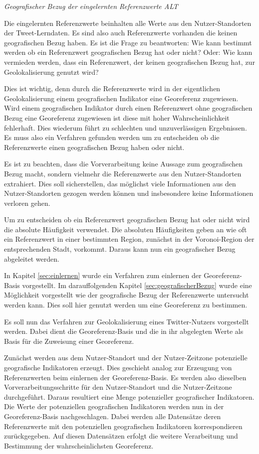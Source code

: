 		\textit{Geografischer Bezug der eingelernten Referenzwerte ALT} \label{sec:geografischerBezug} 
			
			Die eingelernten Referenzwerte beinhalten alle Werte aus den Nutzer-Standorten der Tweet-Lerndaten.
			Es sind also auch Referenzwerte vorhanden die keinen geografischen Bezug haben.
			Es ist die Frage zu beantworten: Wie kann bestimmt werden ob ein Referenzwert geografischen Bezug hat oder nicht?
			Oder: Wie kann vermieden werden, dass ein Referenzwert, der keinen geografischen Bezug hat, zur Geolokalisierung genutzt wird?
			
			Dies ist wichtig, denn durch die Referenzwerte wird in der eigentlichen Geolokalisierung einem geografischen Indikator eine Georeferenz zugewiesen. 
			Wird einem geografischen Indikator durch einen Referenzwert ohne geografischen Bezug eine Georeferenz zugewiesen ist diese mit hoher Wahrscheinlichkeit fehlerhaft.
			Dies wiederum führt zu schlechten und unzuverlässigen Ergebnissen.
			Es muss also ein Verfahren gefunden werden um zu entscheiden ob die Referenzwerte einen geografischen Bezug haben oder nicht.

			Es ist zu beachten, dass die Vorverarbeitung keine Aussage zum geografischen Bezug macht, sondern vielmehr die Referenzwerte aus den Nutzer-Standorten extrahiert. 
			Dies soll sicherstellen, das möglichst viele Informationen aus den Nutzer-Standorten gezogen werden können und insbesondere keine Informationen verloren gehen.  
			
			Um zu entscheiden ob ein Referenzwert geografischen Bezug hat oder nicht wird die absolute Häufigkeit verwendet.
			Die absoluten Häufigkeiten geben an wie oft ein Referenzwert in einer bestimmten Region, zunächst in der Voronoi-Region der entsprechenden Stadt, vorkommt.			 
			Daraus kann nun ein geografischer Bezug abgeleitet werden.

			In Kapitel \ref{sec:einlernen} wurde ein Verfahren zum einlernen der Georeferenz-Basis vorgestellt. 
			Im darauffolgenden Kapitel \ref{sec:geografischerBezug} wurde eine Möglichkeit vorgestellt wie der geografische Bezug der Referenzwerte untersucht werden kann.
			Dies soll hier genutzt werden um eine Georeferenz zu bestimmen. 

			Es soll nun das Verfahren zur Geolokalisierung eines Twitter-Nutzers vorgestellt werden.
			Dabei dient die Georeferenz-Basis und die in ihr abgelegten Werte als Basis für die Zuweisung einer Georeferenz.

			Zunächst werden aus dem Nutzer-Standort und der Nutzer-Zeitzone potenzielle geografische Indikatoren erzeugt.
			Dies geschieht analog zur Erzeugung von Referenzwerten beim einlernen der Georeferenz-Basis.
			Es werden also dieselben Vorverarbeitungsschritte für den Nutzer-Standort und die Nutzer-Zeitzone durchgeführt.
			Daraus resultiert eine Menge potenzieller geografischer Indikatoren.
			Die Werte der potenziellen geografischen Indikatoren werden nun in der Georeferenz-Basis nachgeschlagen. 
			Dabei werden alle Datensätze deren Referenzwerte mit den potenziellen geografischen Indikatoren korrespondieren zurückgegeben.
			Auf diesen Datensätzen erfolgt die weitere Verarbeitung und Bestimmung der wahrscheinlichsten Georeferenz.
			
